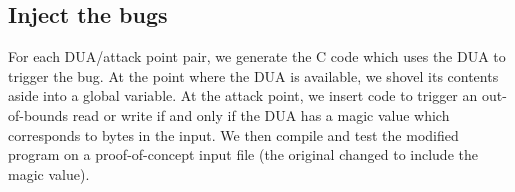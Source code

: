 \subsection{Inject the bugs}
For each DUA/attack point pair, we generate the C code which uses the DUA to trigger the bug.
At the point where the DUA is available, we shovel its contents aside into a global variable.
At the attack point, we insert code to trigger an out-of-bounds read or write if and only if the DUA has a magic value which corresponds to bytes in the input.
We then compile and test the modified program on a proof-of-concept input file (the original changed to include the magic value).